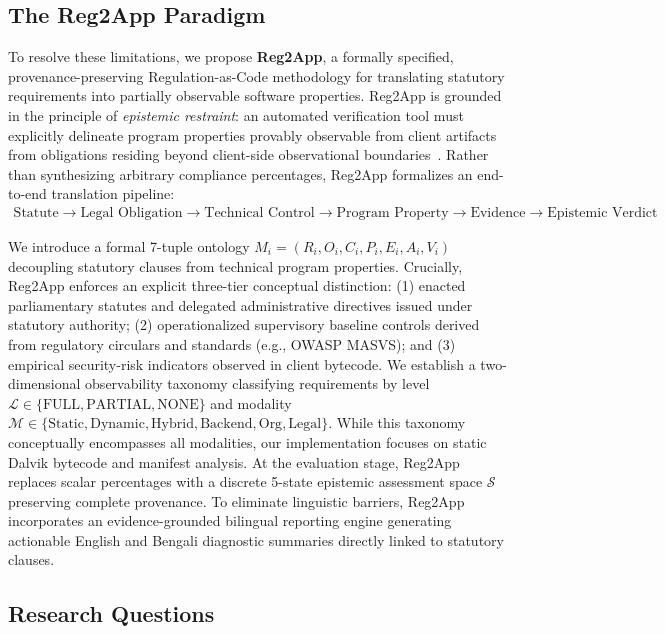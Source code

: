\subsection{The Reg2App Paradigm}
\label{sec:intro:paradigm}

To resolve these limitations, we propose \textbf{Reg2App}, a formally specified, provenance-preserving Regulation-as-Code methodology for translating statutory requirements into partially observable software properties. Reg2App is grounded in the principle of \textit{epistemic restraint}: an automated verification tool must explicitly delineate program properties provably observable from client artifacts from obligations residing beyond client-side observational boundaries~\cite{octeau_reflection}. Rather than synthesizing arbitrary compliance percentages, Reg2App formalizes an end-to-end translation pipeline:
\begin{align*}
\text{Statute} \rightarrow \text{Legal Obligation} \rightarrow \text{Technical Control} \rightarrow \text{Program Property} \rightarrow \text{Evidence} \rightarrow \text{Epistemic Verdict}
\end{align*}

We introduce a formal 7-tuple ontology $M_i = (R_i, O_i, C_i, P_i, E_i, A_i, V_i)$ decoupling statutory clauses from technical program properties. Crucially, Reg2App enforces an explicit three-tier conceptual distinction: (1) enacted parliamentary statutes and delegated administrative directives issued under statutory authority; (2) operationalized supervisory baseline controls derived from regulatory circulars and standards (e.g., OWASP MASVS); and (3) empirical security-risk indicators observed in client bytecode. We establish a two-dimensional observability taxonomy classifying requirements by level $\mathcal{L} \in \{\text{FULL}, \text{PARTIAL}, \text{NONE}\}$ and modality $\mathcal{M} \in \{\text{Static}, \text{Dynamic}, \text{Hybrid}, \text{Backend}, \text{Org}, \text{Legal}\}$. While this taxonomy conceptually encompasses all modalities, our implementation focuses on static Dalvik bytecode and manifest analysis. At the evaluation stage, Reg2App replaces scalar percentages with a discrete 5-state epistemic assessment space $\mathcal{S}$ preserving complete provenance. To eliminate linguistic barriers, Reg2App incorporates an evidence-grounded bilingual reporting engine generating actionable English and Bengali diagnostic summaries directly linked to statutory clauses.

\subsection{Research Questions}
\label{sec:intro:rqs}

